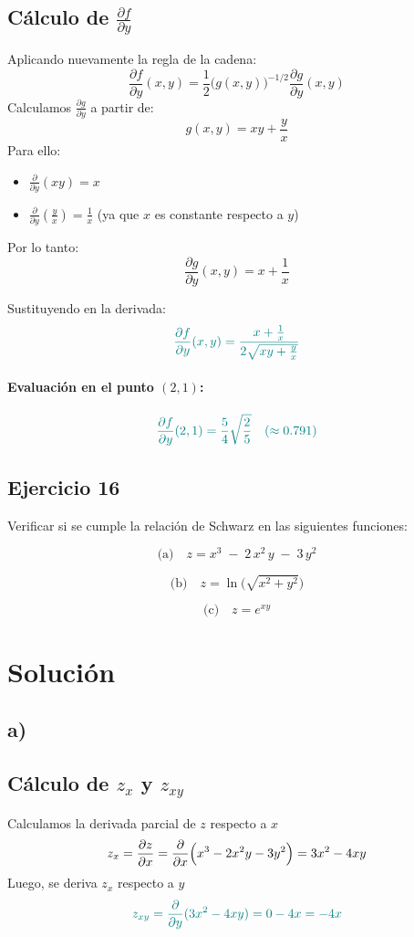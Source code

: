 \documentclass{article}
\begin{document}
\subsection*{Cálculo de \(\frac{\partial f}{\partial y}\)}
Aplicando nuevamente la regla de la cadena:
\[
\frac{\partial f}{\partial y}(x,y)= \frac{1}{2}\bigl( g(x,y) \bigr)^{-1/2}\frac{\partial g}{\partial y}(x,y)
\]
Calculamos \(\frac{\partial g}{\partial y}\) a partir de:
\[
g(x,y)=xy+\frac{y}{x}
\]
Para ello:
\begin{itemize}
    \item \(\frac{\partial}{\partial y}(xy)= x\)
    \item \(\frac{\partial}{\partial y}\left(\frac{y}{x}\right)= \frac{1}{x}\) (ya que \(x\) es constante respecto a \(y\))
\end{itemize}
Por lo tanto:
\[
\frac{\partial g}{\partial y}(x,y)= x+\frac{1}{x}
\]

Sustituyendo en la derivada:
\[\color{teal}
\frac{\partial f}{\partial y}(x,y)= \frac{x+\frac{1}{x}}{2\sqrt{xy+\frac{y}{x}}}
\]

\paragraph{Evaluación en el punto \((2,1)\):}
\[\color{teal}
\frac{\partial f}{\partial y}(2,1)= \frac{5}{4}\sqrt{\frac{2}{5}} \quad (\approx 0.791)
\]


\newpage

\subsection{Ejercicio 16}
Verificar si se cumple la relación de Schwarz en las siguientes funciones:

\[
\text{(a)}\quad z = x^3 \;-\; 2\,x^2\,y \;-\; 3\,y^2
\]

\[
\text{(b)}\quad z = \ln\bigl(\sqrt{x^2 + y^2}\bigr)
\]

\[
\text{(c)}\quad z = e^{xy}
\]

\newpage
\section*{Solución}

\subsection*{a)}

\subsection*{Cálculo de \(z_x\) y \(z_{xy}\)}
Calculamos la derivada parcial de \(z\) respecto a \(x\)
\[
z_x = \frac{\partial z}{\partial x} = \frac{\partial}{\partial x}\Bigl(x^3 - 2x^2y - 3y^2\Bigr) = 3x^2 - 4xy
\]
Luego, se deriva \(z_x\) respecto a \(y\)
\[\color{teal}
z_{xy} = \frac{\partial}{\partial y}(3x^2 - 4xy) = 0 - 4x = -4x
\]
\end{document}
